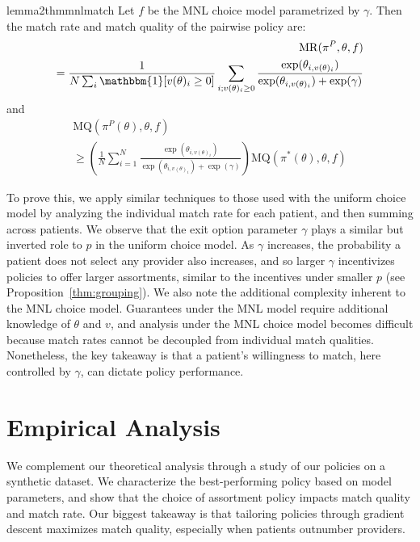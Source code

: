 \documentclass[11pt]{article}
\begin{document}
\begin{restatable}{lemma2}{thmmnlmatch}
\label{thm:mnlmatch}
Let $f$ be the MNL choice model parametrized by $\gamma$. 
Then the match rate and match quality of the pairwise policy are: 
\begin{align}
        \mathrm{MR}(\pi^{P},\theta,f)  \\ = \frac{1}{N\sum_{i} \mathbbm{1}[v(\theta)_{i} \geq 0]} \sum_{i; v(\theta)_{i} \geq 0}^{} \frac{\exp(\theta_{i,v(\theta)_{i}})}{\exp(\theta_{i,v(\theta)_{i}}) + \exp(\gamma)}
\end{align}
and 
\begin{align}
        \mathrm{MQ}(\pi^{P}(\theta),\theta,f) \\  \geq \left(\frac{1}{N} \sum_{i=1}^{N} \frac{\exp(\theta_{i,v(\theta)_{i}})}{\exp(\theta_{i,v(\theta)_{i}}) + \exp(\gamma)}\right) \mathrm{MQ}(\pi^{*}(\theta),\theta,f)
\end{align}
\end{restatable}
To prove this, we apply similar techniques to those used with the uniform choice model by analyzing the individual match rate for each patient, and then summing across patients. We observe that the exit option parameter $\gamma$ plays a similar but inverted role to $p$ in the uniform choice model. 
As $\gamma$ increases, the probability a patient does not select any provider also increases, and so larger $\gamma$ incentivizes policies to offer larger assortments, similar to the incentives under smaller $p$ (see Proposition~\ref{thm:grouping}). 
We also note the additional complexity inherent to the MNL choice model. 
Guarantees under the MNL model require additional knowledge of $\theta$ and $v$, and analysis under the MNL choice model becomes difficult because match rates cannot be decoupled from individual match qualities. 
Nonetheless, the key takeaway is that a patient's willingness to match, here controlled by $\gamma$, can dictate policy performance. 
\section{Empirical Analysis}
\label{sec:empirical}
We complement our theoretical analysis through a study of our policies on a synthetic dataset. 
We characterize the best-performing policy based on model parameters, and show that the choice of assortment policy impacts match quality and match rate. 
Our biggest takeaway is that tailoring policies through gradient descent maximizes match quality, especially when patients outnumber providers. 
\end{document}
